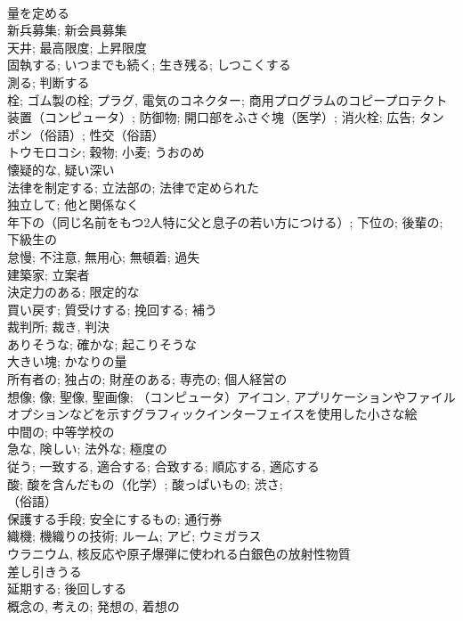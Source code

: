 \documentclass[8pt]{extreport}
\begin{document}
\begin{CJK}{UTF8}{min}
\\	量を定める	
\\	新兵募集; 新会員募集	
\\	天井; 最高限度; 上昇限度	
\\	固執する; いつまでも続く; 生き残る; しつこくする	
\\	測る; 判断する	
\\	栓; ゴム製の栓; プラグ, 電気のコネクター; 商用プログラムのコピープロテクト装置（コンピュータ）; 防御物; 開口部をふさぐ塊（医学）; 消火栓; 広告; タンポン（俗語）; 性交（俗語）	
\\	トウモロコシ; 穀物; 小麦; うおのめ	
\\	懐疑的な, 疑い深い	
\\	法律を制定する; 立法部の; 法律で定められた	
\\	独立して; 他と関係なく	
\\	年下の（同じ名前をもつ2人特に父と息子の若い方につける）; 下位の; 後輩の; 下級生の	
\\	怠慢; 不注意, 無用心; 無頓着; 過失	
\\	建築家; 立案者	
\\	決定力のある; 限定的な	
\\	買い戻す; 質受けする; 挽回する; 補う	
\\	裁判所; 裁き, 判決	
\\	ありそうな; 確かな; 起こりそうな	
\\	大きい塊; かなりの量	
\\	所有者の; 独占の; 財産のある; 専売の; 個人経営の	
\\	想像; 像; 聖像, 聖画像; （コンピュータ）アイコン, アプリケーションやファイルオプションなどを示すグラフィックインターフェイスを使用した小さな絵	
\\	中間の; 中等学校の	
\\	急な, 険しい; 法外な; 極度の	
\\	従う; 一致する, 適合する; 合致する; 順応する, 適応する	
\\	酸; 酸を含んだもの（化学）; 酸っぱいもの; 渋さ; 
\\	（俗語）	
\\	保護する手段; 安全にするもの; 通行券	
\\	織機; 機織りの技術; ルーム; アビ; ウミガラス	
\\	ウラニウム, 核反応や原子爆弾に使われる白銀色の放射性物質	
\\	差し引きうる	
\\	延期する; 後回しする
\\	概念の, 考えの; 発想の, 着想の	

\end{CJK}
\end{document}

